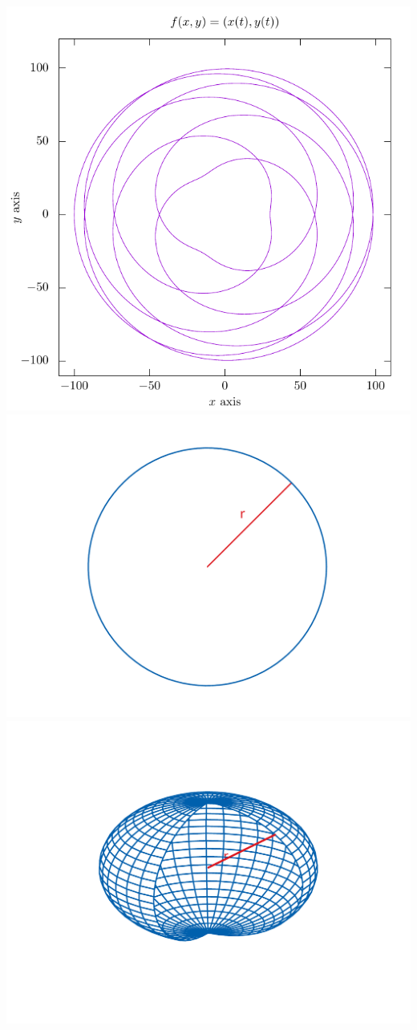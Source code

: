 \documentclass[11.5pt,a4paper]{article}
\begin{document}
\includegraphics[scale=0.50]{ejemplo15.pdf}
\includegraphics[scale=0.25]{ejemplo13.pdf}
\includegraphics[scale=0.30]{ejemplo14.pdf}
\end{document}
